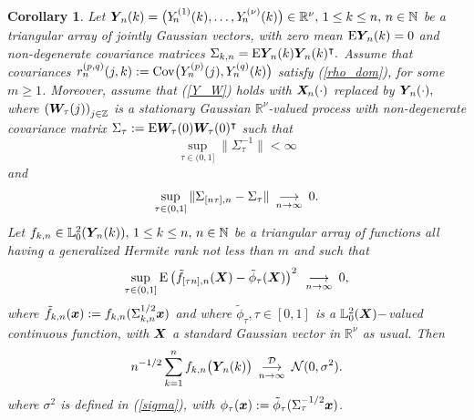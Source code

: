 \documentclass[10pt]{article}
\def\N{\mathbb{N}}
\def\L{\mathbb{L}}
\def\R{\mathbb{R}}
\def\Z{\mathbb{Z}}
\def\E{\mathrm E}
\newcommand{\mbf}[1]{\mbox{\boldmath $#1$}}
\def\limiteloin{\renewcommand{\arraystretch}{0.5}
\begin{array}[t]{c}
\stackrel{{\cal D}}{\longrightarrow} \\
{\scriptstyle n \rightarrow\infty}
\end{array}\renewcommand{\arraystretch}{1}}
\def\limiten{\renewcommand{\arraystretch}{0.5}
\begin{array}[t]{c}
\stackrel{}{\longrightarrow} \\
{\scriptstyle n\rightarrow\infty}
\end{array}\renewcommand{\arraystretch}{1}}
\newtheorem{cor}{Corollary}
\begin{document}
\begin{cor}\label{tlcgauss2}
Let ${\mbf
Y}_{\! n}(k) =  \big (Y^{(1)}_{\! n}(k), \dots, Y^{(\nu)}_{\! n}(k)\big ) \in \R^\nu, \, 1 \le k \le n, \, n \in \N $ be a  triangular
array of jointly Gaussian vectors,  with zero mean $\E {\mbf Y}_{\! n}(k)= 0$ and non-degenerate covariance matrices $\Sigma_{k,n} =
\E  {\mbf
Y}_{\! n}(k) {\mbf
Y}_{\! n}(k)^\intercal.$ 
Assume that covariances 
$r^{(p,q)}_n(j,k) :=  {\rm Cov}\big(Y^{(p)}_n(j), Y^{(q)}_n(k)\big) $ satisfy (\ref{rho_dom}), for some $m \ge 1$.
Moreover, assume that (\ref{Y_W}) holds with ${\mbf
X}_{\! n}(\cdot)$ replaced by ${\mbf
Y}_{\! n}(\cdot),$ where $ \left({\mbf W}_{\! \tau}(j)\right)_{j\in {\Z}} $ is 
a stationary Gaussian ${\R}^\nu$-valued process with non-degenerate covariance matrix
$\Sigma_\tau := \E {\mbf W}_{\! \tau}(0) {\mbf W}_{\! \tau}(0)^\intercal $
such that
\begin{equation} \label{bddS}
\sup_{\tau \in (0,1]} \| \Sigma^{-1}_\tau \| < \infty
\end{equation}
and 
\begin{equation} \label{approxS}
\sup_{\tau \in (0,1]}\|\Sigma_{[n \tau],n} - \Sigma_\tau \| \limiten   0.
\end{equation}
Let $f_{k,n} \in \L^2_0({\mbf
Y}_{\! n}(k)), \, 1\le k \le n, \, n \in \N$ be a triangular array of functions all having a generalized  Hermite rank
not less than $m$ and such that
\begin{eqnarray} \label{rank22}
\sup_{\tau \in (0,1]} \E \left (\tilde f_{[\tau n],n}({\mbf X}) - \tilde \phi_{\tau}({\mbf X})\right )^2 \limiten 0,
\end{eqnarray}
where $\tilde f_{k,n}({\mbf x}) :=f_{k,n}( \Sigma^{1/2}_{k,n} {\mbf x}) $ and where
$ \tilde \phi_\tau, \tau \in [0,1]$ is a $\L^2_0({\mbf X})-$valued continuous function, with ${\mbf X}$ a standard Gaussian vector
in $\R^\nu$ as usual.
Then 
\begin{equation} \label{CLTbis}
n^{-1/2} \sum_{k=1}^n  f_{k,n} \big({\mbf Y}_{\! n}(k) \big) %
\limiteloin {\mathcal N}(0, \sigma^2).
\end{equation}
where $ \sigma^2$ is defined  in (\ref{sigma}), with  $\phi_\tau ({\mbf x}) := \tilde \phi_\tau (\Sigma^{-1/2}_\tau {\mbf x})$.

\end{cor}
\end{document}
